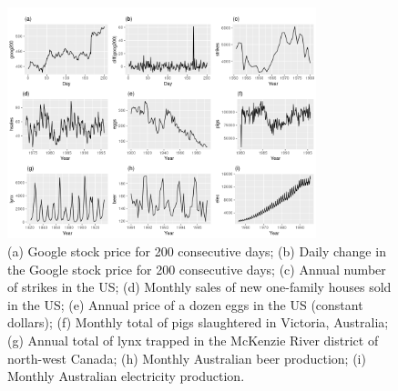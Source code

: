 \documentclass[]{article}
\begin{document}
	\begin{figure}
		\centering
		\includegraphics[width=0.8\textwidth]{images/time_series.png}
		\caption{(a) Google stock price for 200 consecutive days; (b) Daily change in the Google stock price for 200 consecutive days; (c) Annual number of strikes in the US; (d) Monthly sales of new one-family houses sold in the US; (e) Annual price of a dozen eggs in the US (constant dollars); (f) Monthly total of pigs slaughtered in Victoria, Australia; (g) Annual total of lynx trapped in the McKenzie River district of north-west Canada; (h) Monthly Australian beer production; (i) Monthly Australian electricity production.}
		\label{fig:time_series}
	\end{figure}
	
	\subsection{}
	
\end{document}
